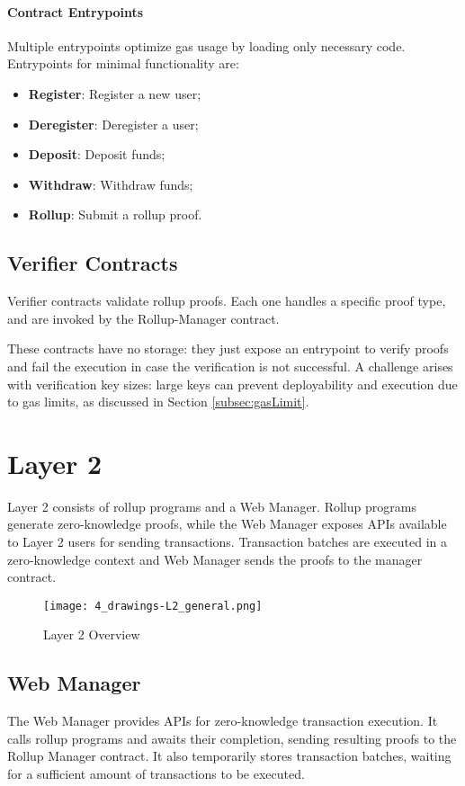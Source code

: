 \paragraph{Contract Entrypoints}
Multiple entrypoints optimize gas usage by loading only necessary code. Entrypoints for minimal functionality are:
\begin{itemize}
  \item \textbf{Register}: Register a new user;
  \item \textbf{Deregister}: Deregister a user;
  \item \textbf{Deposit}: Deposit funds;
  \item \textbf{Withdraw}: Withdraw funds;
  \item \textbf{Rollup}: Submit a rollup proof.
\end{itemize}

\subsection{Verifier Contracts\label{sec:designverifiercontracts}}
Verifier contracts validate rollup proofs. Each one handles a specific proof type, and are invoked by the Rollup-Manager contract.

These contracts have no storage: they just expose an entrypoint to verify proofs and fail the execution in case the verification is not successful. A challenge arises with verification key sizes: large keys can prevent deployability and execution due to gas limits, as discussed in Section \ref{subsec:gasLimit}.

\section{Layer 2\label{sec:designLayer2}}
Layer 2 consists of rollup programs and a Web Manager. Rollup programs generate zero-knowledge proofs, while the Web Manager exposes APIs available to Layer 2 users for sending transactions. Transaction batches are executed in a zero-knowledge context and Web Manager sends the proofs to the manager contract.

\begin{figure}[htb]
  \centering
  \texttt{[image: 4\_drawings-L2\_general.png]}
  \caption{Layer 2 Overview}
  \label{fig:Layer2overview}
\end{figure}

\subsection{Web Manager\label{sec:designwebserver}}
The Web Manager provides APIs for zero-knowledge transaction execution. It calls rollup programs and awaits their completion, sending resulting proofs to the Rollup Manager contract. It also temporarily stores transaction batches, waiting for a sufficient amount of transactions to be executed.

